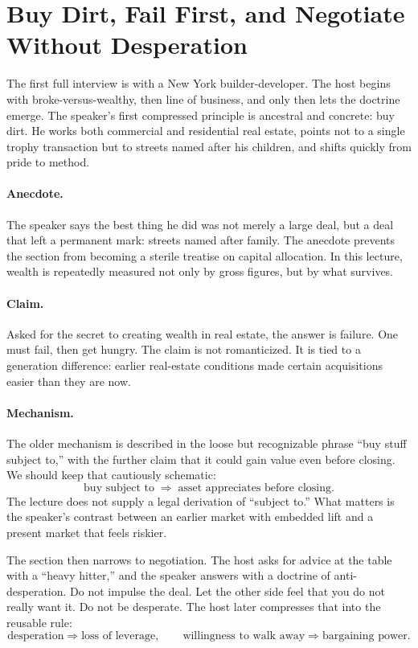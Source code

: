 \section{Buy Dirt, Fail First, and Negotiate Without Desperation}

The first full interview is with a New York builder-developer. The host begins with broke-versus-wealthy, then line of business, and only then lets the doctrine emerge. The speaker's first compressed principle is ancestral and concrete: buy dirt. He works both commercial and residential real estate, points not to a single trophy transaction but to streets named after his children, and shifts quickly from pride to method.

\paragraph{Anecdote.}
The speaker says the best thing he did was not merely a large deal, but a deal that left a permanent mark: streets named after family. The anecdote prevents the section from becoming a sterile treatise on capital allocation. In this lecture, wealth is repeatedly measured not only by gross figures, but by what survives.

\paragraph{Claim.}
Asked for the secret to creating wealth in real estate, the answer is failure. One must fail, then get hungry. The claim is not romanticized. It is tied to a generation difference: earlier real-estate conditions made certain acquisitions easier than they are now.

\paragraph{Mechanism.}
The older mechanism is described in the loose but recognizable phrase ``buy stuff subject to,'' with the further claim that it could gain value even before closing. We should keep that cautiously schematic:
\begin{equation}
\text{buy subject to} \;\Rightarrow\; \text{asset appreciates before closing}.
\end{equation}
The lecture does not supply a legal derivation of ``subject to.'' What matters is the speaker's contrast between an earlier market with embedded lift and a present market that feels riskier.

The section then narrows to negotiation. The host asks for advice at the table with a ``heavy hitter,'' and the speaker answers with a doctrine of anti-desperation. Do not impulse the deal. Let the other side feel that you do not really want it. Do not be desperate. The host later compresses that into the reusable rule:
\begin{equation}
\text{desperation} \Rightarrow \text{loss of leverage},
\qquad
\text{willingness to walk away} \Rightarrow \text{bargaining power}.
\end{equation}


